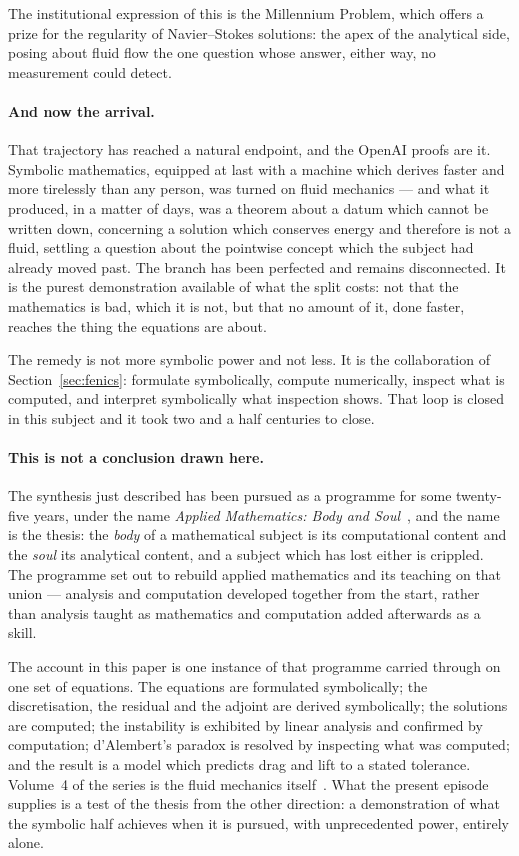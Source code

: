 \documentclass[11pt]{article}
\begin{document}
The institutional expression of this is the Millennium Problem, which offers a prize for the
regularity of Navier--Stokes solutions: the apex of the analytical side, posing about fluid flow the
one question whose answer, either way, no measurement could detect.

\paragraph{And now the arrival.} That trajectory has reached a natural endpoint, and the OpenAI
proofs are it. Symbolic mathematics, equipped at last with a machine which derives faster and more
tirelessly than any person, was turned on fluid mechanics --- and what it produced, in a matter of
days, was a theorem about a datum which cannot be written down, concerning a solution which conserves
energy and therefore is not a fluid, settling a question about the pointwise concept which the
subject had already moved past. The branch has been perfected and remains disconnected. It is the
purest demonstration available of what the split costs: not that the mathematics is bad, which it is
not, but that no amount of it, done faster, reaches the thing the equations are about.

The remedy is not more symbolic power and not less. It is the collaboration of
Section~\ref{sec:fenics}: formulate symbolically, compute numerically, inspect what is computed, and
interpret symbolically what inspection shows. That loop is closed in this subject and it took two and
a half centuries to close.

\paragraph{This is not a conclusion drawn here.} The synthesis just described has been pursued as a
programme for some twenty-five years, under the name \emph{Applied Mathematics: Body and
Soul}~\cite{bodysoul,bsbooks}, and the name is the thesis: the \emph{body} of a mathematical subject
is its computational content and the \emph{soul} its analytical content, and a subject which has lost
either is crippled. The programme set out to rebuild applied mathematics and its teaching on that
union --- analysis and computation developed together from the start, rather than analysis taught as
mathematics and computation added afterwards as a skill.

The account in this paper is one instance of that programme carried through on one set of equations.
The equations are formulated symbolically; the discretisation, the residual and the adjoint are
derived symbolically; the solutions are computed; the instability is exhibited by linear analysis and
confirmed by computation; d'Alembert's paradox is resolved by inspecting what was computed; and the
result is a model which predicts drag and lift to a stated tolerance. Volume~4 of the series is the
fluid mechanics itself~\cite{book}. What the present episode supplies is a test of the thesis from
the other direction: a demonstration of what the symbolic half achieves when it is pursued, with
unprecedented power, entirely alone.
\end{document}
